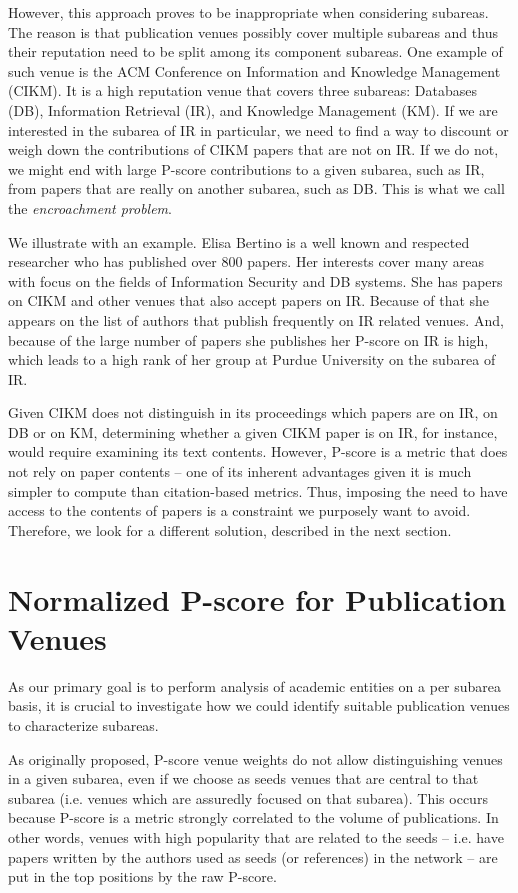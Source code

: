\documentclass[msc]{ppgccufmg}
\begin{document}
However, this approach proves to be inappropriate when considering subareas. The reason is that publication venues possibly cover multiple subareas and thus their reputation need to be split among its component subareas. One example of such venue is the ACM Conference on Information and Knowledge Management (CIKM). It is a high reputation venue that covers three subareas: Databases (DB), Information Retrieval (IR), and Knowledge Management (KM). If we are interested in the subarea of IR in particular, we need to find a way to discount or weigh down the contributions of CIKM papers that are not on IR. If we do not, we might end with large P-score contributions to a given subarea, such as IR, from papers that are really on another subarea, such as DB. This is what we call the \textit{encroachment problem}. 

We illustrate with an example. Elisa Bertino is a well known and respected researcher who has published over 800 papers. Her interests cover many areas with focus on the fields of Information Security and DB systems. She has papers on CIKM and other venues that also accept papers on IR. Because of that she appears on the list of authors that publish frequently on IR related venues. And, because of the large number of papers she publishes her P-score on IR is high, which leads to a high rank of her group at Purdue University on the subarea of IR.

Given CIKM does not distinguish in its proceedings which papers are on IR, on DB or on KM, determining whether a given CIKM paper is on IR, for instance, would require examining its text contents. However, P-score is a metric that does not rely on paper contents -- one of its inherent advantages given it is much simpler to compute than citation-based metrics. Thus, imposing the need to have access to the contents of papers is a constraint we purposely want to avoid. Therefore, we look for a different solution, described in the next section.


\section{Normalized P-score for Publication Venues}\label{sec:npscore}

As our primary goal is to perform analysis of academic entities on a per subarea basis, it is crucial to investigate how we could identify suitable publication venues to characterize subareas. 

As originally proposed, P-score venue weights do not allow distinguishing venues in a given subarea, even if we choose as seeds venues that are central to that subarea (i.e. venues which are assuredly focused on that subarea). This occurs because P-score is a metric strongly correlated to the volume of publications. In other words, venues with high popularity that are related to the seeds -- i.e. have papers written by the authors used as seeds (or references) in the network -- are put in the top positions by the raw P-score.
\end{document}
